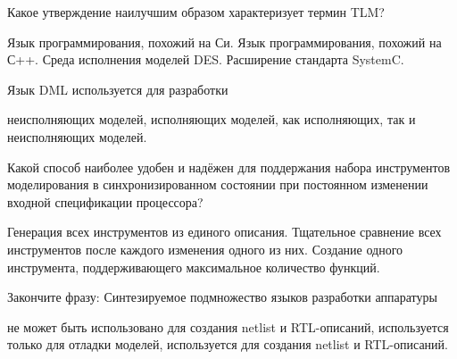 \begin{questions}

\question[3] Какое утверждение наилучшим образом характеризует термин TLM?
\begin{choices}
	\choice Язык программирования, похожий на Си.
    \choice Язык программирования, похожий на С++.
    \choice Среда исполнения моделей DES.
	\correctchoice Расширение стандарта SystemC.
\end{choices}

\question[3] Язык DML используется для разработки
\begin{choices}
	\correctchoice неисполняющих моделей,
    \choice исполняющих моделей,
    \choice как исполняющих, так и неисполняющих моделей.
\end{choices}

\question[3] Какой способ наиболее удобен и надёжен для поддержания набора инструментов моделирования в синхронизированном состоянии при постоянном изменении входной спецификации процессора?
\begin{choices}
	\correctchoice Генерация всех инструментов из единого описания.
    \choice Тщательное сравнение всех инструментов после каждого изменения одного из них.
    \choice Создание одного инструмента, поддерживающего максимальное количество функций.
\end{choices}

\question[3] Закончите фразу: Синтезируемое подмножество языков разработки аппаратуры
\begin{choices}
\choice не может быть использовано для создания netlist и RTL-описаний,
\choice используется только для отладки моделей,
\correctchoice  используется для создания netlist и RTL-описаний.
\end{choices}

\end{questions}

